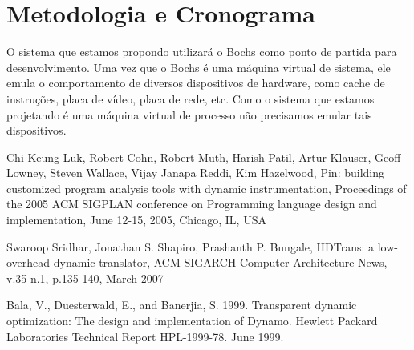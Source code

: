 \documentclass[11pt,twoside]{article}
\begin{document}
\section{Metodologia e Cronograma}
%

O sistema que estamos propondo utilizará o Bochs como ponto de partida
para desenvolvimento. Uma vez que o Bochs é uma máquina virtual de sistema,
ele emula o comportamento de diversos dispositivos de hardware, como
cache de instruções, placa de vídeo, placa de rede, etc. Como o sistema
que estamos projetando é uma máquina virtual de processo não precisamos
emular tais dispositivos. 

\begin{thebibliography}{99}

Chi-Keung Luk, Robert Cohn, Robert Muth, Harish Patil, Artur
Klauser, Geoff Lowney, Steven Wallace, Vijay Janapa Reddi, Kim Hazelwood, 
Pin: building customized program analysis tools with dynamic instrumentation, 
Proceedings of the 2005 ACM SIGPLAN conference on Programming language design
and implementation, June 12-15, 2005, Chicago, IL, USA 

Swaroop Sridhar, Jonathan S. Shapiro, Prashanth P. Bungale, 
HDTrans: a low-overhead dynamic translator, ACM SIGARCH Computer Architecture
News, v.35 n.1, p.135-140, March 2007 

Bala, V., Duesterwald, E., and Banerjia, S. 1999. Transparent
dynamic optimization: The design and implementation of Dynamo. Hewlett Packard
Laboratories Technical Report HPL-1999-78. June 1999. 

\end{thebibliography}
\end{document}
